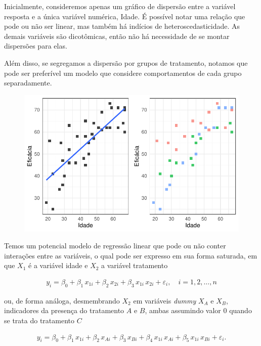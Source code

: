 \documentclass[
  letterpaper,
  DIV=11,
  numbers=noendperiod]{scrartcl}
\begin{document}
Inicialmente, consideremos apenas um gráfico de dispersão entre a
variável resposta e a única variável numérica, Idade. É possível notar
uma relação que pode ou não ser linear, mas também há indícios de
heteroscedasticidade. As demais variáveis são dicotômicas, então não há
necessidade de se montar dispersões para elas.

Além disso, se segregamos a dispersão por grupos de tratamento, notamos
que pode ser preferível um modelo que considere comportamentos de cada
grupo separadamente.

\begin{figure}

{\centering \includegraphics{lista2_files/figure-pdf/scatter-variaveis-1.pdf}

}

\end{figure}

Temos um potencial modelo de regressão linear que pode ou não conter
interações entre as variáveis, o qual pode ser expresso em sua forma
saturada, em que \(X_1\) é a variável idade e \(X_2\) a variável
tratamento

\begin{align}
  y_i = \beta_0 + \beta_1 \, x_{1i} + \beta_2 \, x_{2i} + \beta_3 \, x_{1i}\, x_{2i} + \varepsilon_i, \quad i = 1, 2, \dots, n
\end{align}

ou, de forma análoga, desmembrando \(X_2\) em variáveis \emph{dummy}
\(X_A\) e \(X_B\), indicadores da presença do tratamento \(A\) e \(B\),
ambas assumindo valor \(0\) quando se trata do tratamento \(C\)

\begin{align}
  y_i = \beta_0 + \beta_1 \, x_{1i} + \beta_2 \, x_{Ai} + \beta_3 \, x_{Bi} + \beta_4 \, x_{1i} \, x_{Ai} + \beta_5 \, x_{1i} \, x_{Bi} + \varepsilon_i. \label{modelo_dummy}
\end{align}
\end{document}
